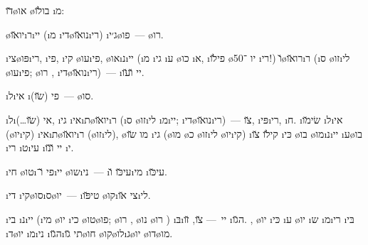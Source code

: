 \u{דו}\o{או} \o{בו}\u{לו} \i{מ}:
\begin{compactitem}
\item {}\o{יו}\u{או}\i{ר}\i{יי} (\i{מ}  \i{די}\o{נו}\u{או}\i{רי}) \i{ג׳י}\o{פו}~—  \o{רו}.
\item \i{צי}\o{פּו}\i{רי}, \i{פי}, \i{קי} \o{עו}\i{פי}, \o{או}\i{נ}\i{יי} (\i{מ}  \i{גי} \i{ע} \o{כו} \i{א}, \i{פי}\u{לו} \o{יו} ־50 \i{רי}!) \u{ו}\o{רו}\u{או}\i{ר} (\i{ס}  \o{זו}\i{לי} \o{עו}\i{פי}; \o{רו} ,   \i{די}\o{נו}\u{או}\i{רי})~— \i{יי} \u{ו}\u{עו}.
\item \i{ל}\i{אי} \i{פי} (\u{שו})~— \o{סו}.
\item \i{ל}\i{אי} (\u{שו}…), \i{גי} \i{אי}\i{ת}\o{יו}\u{או}\i{ר} (\i{ס}  \o{זו}\i{לי} \i{מ}\i{יי};  \i{די}\o{נו}\u{או}\i{רי})~— \u{צו}, \i{פּי}\i{רי}, \i{ח}. \i{שׂי}\u{מו}  \i{ל}\i{אי} (\o{יו}\i{קי}) \i{אי}\i{ת}\o{יו}\u{או}\i{ר} (\o{זו}\i{לי}), \o{מו} \u{שו} \i{גי} (\o{מו} \o{כ} \o{זו}\i{לי} \o{יו}\i{קי}) \i{קי}\u{לו} \u{צו} \i{כּי}  \o{בו} \o{מו}\i{נ}\i{יי} \i{ע}\o{בו} \i{רי} \i{ט}\i{עי}  \i{יי} \u{ו}\u{נו} \i{י}.
\item {}\i{חי} \o{טו}\i{פי} \u{ו}־\i{יי} \o{שו}\i{ני}~— \i{עי}\u{כּו} \u{ו}\i{מי} \i{עי}\u{כּו}.
\item {}\i{די} \i{קי}\o{סו}\i{ס}\o{יו}~— \i{טי}\u{פּו} \o{קו}\i{צי} \u{או}\i{לי}.
\item {}\i{בי} \i{נ}\i{יי} (\i{מי}  \o{יו} \i{כי} \o{טו}\o{פו}; \o{רו} , \o{נו} \o{רו}  ) \i{בּ}\i{יי}~— \u{צו}, \u{זו} \i{ה}\u{גו}. ,   \o{יו} \i{כּי} \i{ע} \o{יו} \i{ש}  \i{מ}\i{רי} \i{בּי}  \i{ד}\o{יו} \i{מ}\i{ני} \i{ה}\u{גו}\i{תי} \u{גו}\o{חו} \o{קו}\o{לו}\i{ג}\o{יו} \o{דו}\o{מו}.
\end{compactitem}
